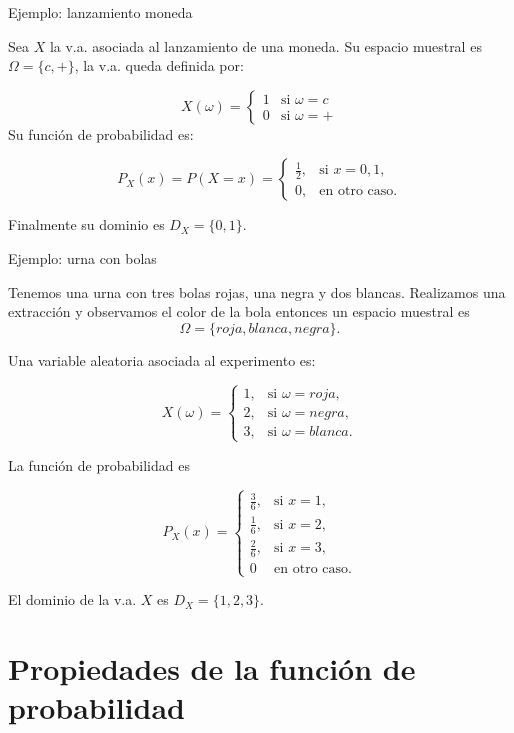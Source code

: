 \documentclass[
  letterpaper,
  DIV=11,
  numbers=noendperiod]{scrreprt}
\begin{document}
\begin{Ejemplo}{Ejemplo: lanzamiento moneda}{}

Sea \(X\) la v.a. asociada al lanzamiento de una moneda. Su espacio
muestral es \(\Omega=\{c,+\}\), la v.a. queda definida por:

\[X(\omega)=\left\{\begin{array}{ll} 1 & \mbox{si } \omega=c \\
0 & \mbox{si }\omega=+\end{array}\right.\] Su función de probabilidad
es:

\[P_{X}(x)=P(X=x)=\left\{\begin{array}{ll} \frac12, & \mbox{si } x=0,1,\\
0, & \mbox{en otro caso}.\end{array}\right.\]

Finalmente su dominio es \(D_X=\{0,1\}.\)

\end{Ejemplo}

\begin{Ejemplo}{Ejemplo: urna con bolas}{}

Tenemos una urna con tres bolas rojas, una negra y dos blancas.
Realizamos una extracción y observamos el color de la bola entonces un
espacio muestral es \[\Omega=\{roja, blanca, negra\}.\]

Una variable aleatoria asociada al experimento es:

\[X(\omega)=\left\{\begin{array}{ll} 1, & \mbox{si } \omega=roja,  \\
2, & \mbox{si }\omega=negra ,\\ 3, & \mbox{si } \omega=blanca.\end{array}\right.\]

La función de probabilidad es

\[P_{X}(x)=\left\{\begin{array}{ll} \frac36, & \mbox{si } x=1,\\[0.5ex]
\frac16, & \mbox{si } x=2,\\ \frac26, & \mbox{si } x=3,\\ 0 & \mbox{en otro
caso.}\end{array}\right.\]

El dominio de la v.a. \(X\) es \(D_X=\{1,2,3\}.\)

\end{Ejemplo}

\section{Propiedades de la función de
probabilidad}\label{propiedades-de-la-funciuxf3n-de-probabilidad}
\end{document}
